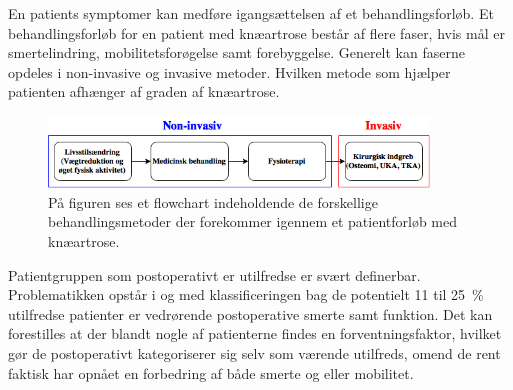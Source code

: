 En patients symptomer kan medføre igangsættelsen af et behandlingsforløb. Et behandlingsforløb for en patient med knæartrose består af flere faser, hvis mål er smertelindring, mobilitetsforøgelse samt forebyggelse. Generelt kan faserne opdeles i non-invasive og invasive metoder. Hvilken metode som hjælper patienten afhænger af graden af knæartrose.

\begin{figure}[H]
	\centering
	\includegraphics[width=0.9\textwidth]{../figures/bProblemanalyse/flowchart_behandlingsforloeb.png}
	\caption{På figuren ses et flowchart indeholdende de forskellige behandlingsmetoder der forekommer igennem et patientforløb med knæartrose.}
	\label{fig:flow_behandlingsfaser}
\end{figure}\vspace{-.25cm}

Patientgruppen som postoperativt er utilfredse er svært definerbar. Problematikken opstår i og med klassificeringen bag de potentielt 11 til 25~\% utilfredse patienter er vedrørende postoperative smerte samt funktion. Det kan forestilles at der blandt nogle af patienterne findes en forventningsfaktor, hvilket gør de postoperativt kategoriserer sig selv som værende utilfreds, omend de rent faktisk har opnået en forbedring af både smerte og eller mobilitet.


